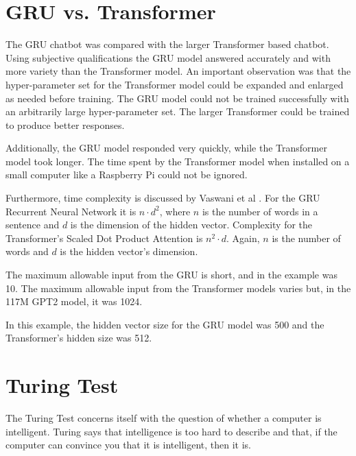 

\section{GRU vs. Transformer}
The GRU chatbot was compared with the larger Transformer based chatbot. Using subjective qualifications the GRU model answered accurately and with more variety than the Transformer model. An important observation was that the hyper-parameter set for the Transformer model could be expanded and enlarged as needed before training. The GRU model could not be trained successfully with an arbitrarily large hyper-parameter set. The larger Transformer could be trained to produce better responses.

Additionally, the GRU model responded very quickly, while the Transformer model took longer. %
The time spent by the Transformer model when installed on a small computer like a Raspberry Pi could not be ignored. 


Furthermore, time complexity is discussed by Vaswani et al \cite{Vaswani2017AttentionIA}. 
For the GRU Recurrent Neural Network it is $ n \cdot d^2 $, where $ n $ is the number of words in a sentence and $ d $ is the dimension of the hidden vector. Complexity for the Transformer's Scaled Dot Product Attention is $ n^2 \cdot  d $. Again, $n$ is the number of words and $d$ is the hidden vector's dimension. 

The maximum allowable input from the GRU is short, and in the example was 10. The maximum allowable input from the Transformer models varies but, in the 117M GPT2 model, it was 1024. 

In this example, the hidden vector size for the GRU model was 500 and %
the Transformer's hidden size was 512.

\section{Turing Test}

The Turing Test concerns itself with the question of whether a computer is intelligent. Turing says that intelligence is too hard to describe and that, if the computer can convince you that it is intelligent, then it is.

